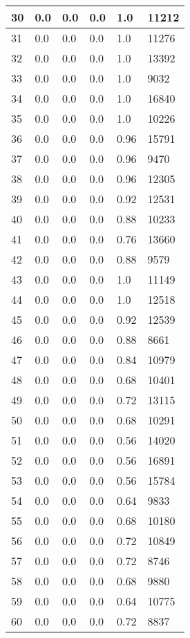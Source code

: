 \begin{longtable}{|l|l|l|l|l|l|}
30 & 0.0 & 0.0 & 0.0 & 1.0 & 11212 \\ \hline 
31 & 0.0 & 0.0 & 0.0 & 1.0 & 11276 \\ \hline 
32 & 0.0 & 0.0 & 0.0 & 1.0 & 13392 \\ \hline 
33 & 0.0 & 0.0 & 0.0 & 1.0 & 9032 \\ \hline 
34 & 0.0 & 0.0 & 0.0 & 1.0 & 16840 \\ \hline 
35 & 0.0 & 0.0 & 0.0 & 1.0 & 10226 \\ \hline 
36 & 0.0 & 0.0 & 0.0 & 0.96 & 15791 \\ \hline 
37 & 0.0 & 0.0 & 0.0 & 0.96 & 9470 \\ \hline 
38 & 0.0 & 0.0 & 0.0 & 0.96 & 12305 \\ \hline 
39 & 0.0 & 0.0 & 0.0 & 0.92 & 12531 \\ \hline 
40 & 0.0 & 0.0 & 0.0 & 0.88 & 10233 \\ \hline 
41 & 0.0 & 0.0 & 0.0 & 0.76 & 13660 \\ \hline 
42 & 0.0 & 0.0 & 0.0 & 0.88 & 9579 \\ \hline 
43 & 0.0 & 0.0 & 0.0 & 1.0 & 11149 \\ \hline 
44 & 0.0 & 0.0 & 0.0 & 1.0 & 12518 \\ \hline 
45 & 0.0 & 0.0 & 0.0 & 0.92 & 12539 \\ \hline 
46 & 0.0 & 0.0 & 0.0 & 0.88 & 8661 \\ \hline 
47 & 0.0 & 0.0 & 0.0 & 0.84 & 10979 \\ \hline 
48 & 0.0 & 0.0 & 0.0 & 0.68 & 10401 \\ \hline 
49 & 0.0 & 0.0 & 0.0 & 0.72 & 13115 \\ \hline 
50 & 0.0 & 0.0 & 0.0 & 0.68 & 10291 \\ \hline 
51 & 0.0 & 0.0 & 0.0 & 0.56 & 14020 \\ \hline 
52 & 0.0 & 0.0 & 0.0 & 0.56 & 16891 \\ \hline 
53 & 0.0 & 0.0 & 0.0 & 0.56 & 15784 \\ \hline 
54 & 0.0 & 0.0 & 0.0 & 0.64 & 9833 \\ \hline 
55 & 0.0 & 0.0 & 0.0 & 0.68 & 10180 \\ \hline 
56 & 0.0 & 0.0 & 0.0 & 0.72 & 10849 \\ \hline 
57 & 0.0 & 0.0 & 0.0 & 0.72 & 8746 \\ \hline 
58 & 0.0 & 0.0 & 0.0 & 0.68 & 9880 \\ \hline 
59 & 0.0 & 0.0 & 0.0 & 0.64 & 10775 \\ \hline 
60 & 0.0 & 0.0 & 0.0 & 0.72 & 8837 \\ \hline 

\end{longtable}
